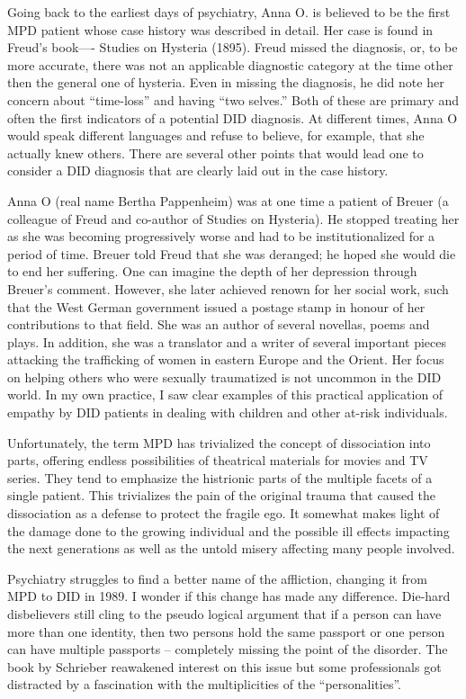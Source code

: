 \documentclass[]{book}
\begin{document}
Going back to the earliest days of psychiatry, Anna O. is believed to be the first MPD patient whose case history was described in detail. Her case is found in Freud's book---- Studies on Hysteria (1895). Freud missed the diagnosis, or, to be more accurate, there was not an applicable diagnostic category at the time other then the general one of hysteria. Even in missing the diagnosis, he did note her concern about ``time-loss'' and having ``two selves.'' Both of these are primary and often the first indicators of a potential DID diagnosis. At different times, Anna O would speak different languages and refuse to believe, for example, that she actually knew others. There are several other points that would lead one to consider a DID diagnosis that are clearly laid out in the case history.

Anna O (real name Bertha Pappenheim) was at one time a patient of Breuer (a colleague of Freud and co-author of Studies on Hysteria). He stopped treating her as she was becoming progressively worse and had to be institutionalized for a period of time. Breuer told Freud that she was deranged; he hoped she would die to end her suffering. One can imagine the depth of her depression through Breuer's comment. However, she later achieved renown for her social work, such that the West German government issued a postage stamp in honour of her contributions to that field. She was an author of several novellas, poems and plays. In addition, she was a translator and a writer of several important pieces attacking the trafficking of women in eastern Europe and the Orient. Her focus on helping others who were sexually traumatized is not uncommon in the DID world. In my own practice, I saw clear examples of this practical application of empathy by DID patients in dealing with children and other at-risk individuals.

Unfortunately, the term MPD has trivialized the concept of dissociation into parts, offering endless possibilities of theatrical materials for movies and TV series. They tend to emphasize the histrionic parts of the multiple facets of a single patient. This trivializes the pain of the original trauma that caused the dissociation as a defense to protect the fragile ego. It somewhat makes light of the damage done to the growing individual and the possible ill effects impacting the next generations as well as the untold misery affecting many people involved.

Psychiatry struggles to find a better name of the affliction, changing it from MPD to DID in 1989. I wonder if this change has made any difference. Die-hard disbelievers still cling to the pseudo logical argument that if a person can have more than one identity, then two persons hold the same passport or one person can have multiple passports -- completely missing the point of the disorder. The book by Schrieber reawakened interest on this issue but some professionals got distracted by a fascination with the multiplicities of the ``personalities''.
\end{document}
